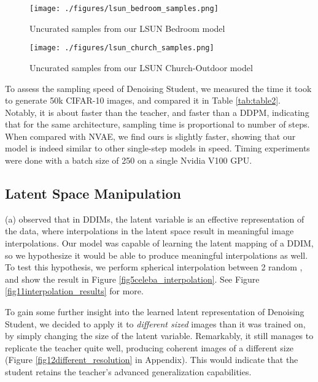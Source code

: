 \documentclass[12pt,a4paper]{article}
\begin{document}
\vspace{-0.25cm}
\begin{minipage}{0.45\linewidth} 
\begin{figure}[H]
\texttt{[image: ./figures/lsun\_bedroom\_samples.png]}
\caption{Uncurated samples from our LSUN Bedroom model}
\label{fig3lsun_bedroom_samples}
\end{figure}
\end{minipage}
\hspace{1cm}
\begin{minipage}{0.45\linewidth} 
\begin{figure}[H]
\texttt{[image: ./figures/lsun\_church\_samples.png]}
\caption{Uncurated samples from our LSUN Church-Outdoor model}
\label{fig4lsun_church_samples}
\end{figure}
\end{minipage}

To assess the sampling speed of Denoising Student, we measured the time it took to generate 50k CIFAR-10 images, and compared it in Table \ref{tab:table2}. Notably, it is about  faster than the teacher, and  faster than a DDPM, indicating that for the same architecture, sampling time is proportional to number of steps. When compared with NVAE, we find ours is slightly faster, showing that our model is indeed similar to other single-step models in speed. Timing experiments were done with a batch size of 250 on a single Nvidia V100 GPU. 

\subsection{Latent Space Manipulation}

\citeauthor{ddim} (\citeyear{ddim}a) observed that in DDIMs, the latent variable  is an effective representation of the data, where interpolations in the latent space result in meaningful image interpolations. Our model was capable of learning the latent mapping of a DDIM, so we hypothesize it would be able to produce meaningful interpolations as well. To test this hypothesis, we perform spherical interpolation between 2 random , and show the result in Figure \ref{fig5celeba_interpolation}. See Figure \ref{fig11interpolation_results} for more.

To gain some further insight into the learned latent representation of Denoising Student, we decided to apply it to \textit{different sized} images than it was trained on, by simply changing the size of the latent variable. Remarkably, it still manages to replicate the teacher quite well, producing coherent images of a different size (Figure \ref{fig12different_resolution} in Appendix). This would indicate that the student retains the teacher's advanced generalization capabilities.
\end{document}
